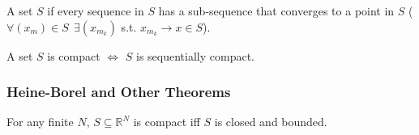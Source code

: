 \documentclass{article}
\begin{document}
\begin{definition}\label{def:lecture3_compactness_sequentially_compact}
  A set $S$  if every sequence in $S$ has a sub-sequence that converges to a point in $S$ ($\forall (x_m) \in S ~~ \exists (x_{m_k})$ s.t. $x_{m_k} \to x \in S$).
\end{definition}

\begin{theorem}\label{thm:lecture3_compactness_iff_sequential_compactness}
  A set $S$ is compact $\iff$ $S$ is sequentially compact.
\end{theorem}

\subsubsection{Heine-Borel and Other Theorems}
\label{ssub:heine_borel_and_other_theorems}

\begin{theorem}\label{thm:lecture3_compactness_heine_borel_modern}
  For any finite $N$, $S \subseteq \mathbb{R}^N$ is compact iff $S$ is closed and bounded.
\end{theorem}
\end{document}
